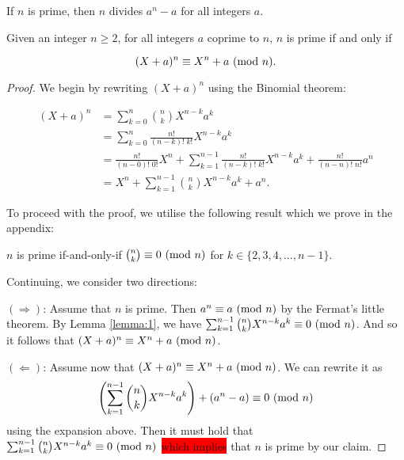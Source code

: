 \documentclass[../main.tex]{subfiles}
\begin{document}
\begin{theorem} \label{theorem: flt}
    If $n$ is prime, then $n$ divides $a^{n} - a$ for all integers $a$.
\end{theorem}

\begin{theorem} \label{theorem:1}
Given an integer $n \geq 2$, for all integers $a$ coprime to $n$, $n$ is prime if and only if

\begin{equation}
    (X + a)^{n} \equiv X^{n} + a \ (\mathrm{mod}\ n).
\end{equation}

\end{theorem}

\begin{proof}

We begin by rewriting $(X + a)^{n}$ using the Binomial theorem:

\begin{equation*}
    \begin{split}
        (X + a)^{n} &= \sum_{k=0}^{n} \binom{n}{k} X^{n-k} a^{k} \\
        &= \sum_{k=0}^{n} \frac{n!}{(n-k)!\;k!} X^{n-k} a^{k} \\
        &= \frac{n!}{(n-0)!\;0!} X^{n} + \sum_{k=1}^{n-1} \frac{n!}{(n-k)!\;k!} X^{n-k} a^{k} + \frac{n!}{(n-n)!\;n!} a^{n} \\
        &= X^{n} + \sum_{k=1}^{n-1} \binom{n}{k} X^{n-k} a^{k} + a^{n}.
    \end{split}
\end{equation*}

To proceed with the proof, we utilise the following result which we prove in the appendix:

\begin{lemma} \label{lemma:1}
    $n$ is prime if-and-only-if $\binom{n}{k} \equiv 0 \ (\mathrm{mod}\ n)$ for $k \in \{ 2,3,4,...,n-1 \}$.
\end{lemma}

Continuing, we consider two directions:

$(\Longrightarrow)$: Assume that $n$ is prime. Then $a^{n} \equiv a \ (\mathrm{mod}\ n)$ by the Fermat's little theorem. By Lemma \ref{lemma:1}, we have $\sum_{k=1}^{n-1} \binom{n}{k} X^{n-k} a^{k} \equiv 0 \ (\mathrm{mod}\ n)$. And so it follows that $(X + a)^{n} \equiv X^{n} + a \ (\mathrm{mod}\ n)$.
\newline

$(\Longleftarrow)$: Assume now that $(X + a)^{n} \equiv X^{n} + a \ (\mathrm{mod}\ n)$. We can rewrite it as $$ \Biggl( \sum_{k=1}^{n-1} \binom{n}{k} X^{n-k} a^{k} \Biggr) + (a^{n} - a) \equiv 0 \ (\mathrm{mod}\ n) $$ using the expansion above. Then it must hold that $\sum_{k=1}^{n-1} \binom{n}{k} X^{n-k} a^{k} \equiv 0 \ (\mathrm{mod}\ n)$ \colorbox{red}{which implies} that $n$ is prime by our claim.

\end{proof}
\end{document}
